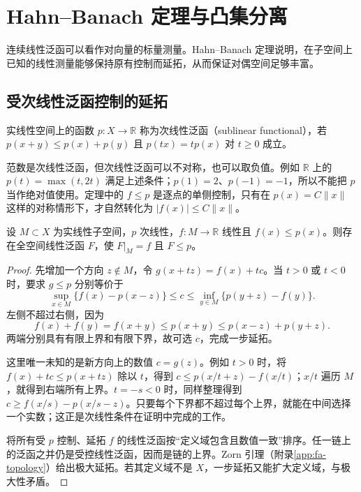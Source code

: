 \setcounter{chapter}{5} %
\chapter{Hahn--Banach 定理与凸集分离}
\label{chap:fa-hahn-banach}

连续线性泛函可以看作对向量的标量测量。Hahn--Banach 定理说明，在子空间上已知的线性测量能够保持原有控制而延拓，从而保证对偶空间足够丰富。

\section{受次线性泛函控制的延拓}
实线性空间上的函数 $p:X\to\mathbb R$ 称为次线性泛函（sublinear functional），若 $p(x+y)\leq p(x)+p(y)$ 且 $p(tx)=tp(x)$ 对 $t\geq0$ 成立。

范数是次线性泛函，但次线性泛函可以不对称，也可以取负值。例如 $\mathbb R$ 上的 $p(t)=\max(t,2t)$ 满足上述条件；$p(1)=2$、$p(-1)=-1$，所以不能把 $p$ 当作绝对值使用。定理中的 $f\leq p$ 是逐点的单侧控制，只有在 $p(x)=C\|x\|$ 这样的对称情形下，才自然转化为 $|f(x)|\leq C\|x\|$。
\begin{theorem}\label{thm:fa-hahn-banach-real}
设 $M\subset X$ 为实线性子空间，$p$ 次线性，$f:M\to\mathbb R$ 线性且 $f(x)\leq p(x)$。则存在全空间线性泛函 $F$，使 $F|_M=f$ 且 $F\leq p$。
\end{theorem}
\begin{proof}
先增加一个方向 $z\notin M$，令 $g(x+tz)=f(x)+tc$。当 $t>0$ 或 $t<0$ 时，要求 $g\leq p$ 分别等价于
\[
 \sup_{x\in M}\{f(x)-p(x-z)\}\leq c
 \leq\inf_{y\in M}\{p(y+z)-f(y)\}.
\]
左侧不超过右侧，因为
\[
 f(x)+f(y)=f(x+y)\leq p(x+y)\leq p(x-z)+p(y+z).
\]
两端分别具有有限上界和有限下界，故可选 $c$，完成一步延拓。

这里唯一未知的是新方向上的数值 $c=g(z)$。例如 $t>0$ 时，将 $f(x)+tc\leq p(x+tz)$ 除以 $t$，得到 $c\leq p(x/t+z)-f(x/t)$；$x/t$ 遍历 $M$，就得到右端所有上界。$t=-s<0$ 时，同样整理得到 $c\geq f(x/s)-p(x/s-z)$。只要每个下界都不超过每个上界，就能在中间选择一个实数；这正是次线性条件在证明中完成的工作。

将所有受 $p$ 控制、延拓 $f$ 的线性泛函按“定义域包含且数值一致”排序。任一链上的泛函之并仍是受控线性泛函，因而是链的上界。Zorn 引理（附录\ref{app:fa-topology}）给出极大延拓。若其定义域不是 $X$，一步延拓又能扩大定义域，与极大性矛盾。
\end{proof}

